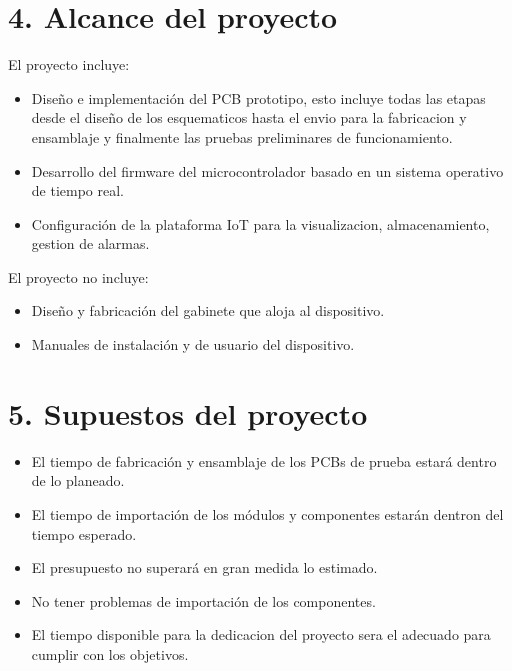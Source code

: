 \documentclass[
11pt, %
codirector, %
]{charter}
\begin{document}
\section{4. Alcance del proyecto}
\label{sec:alcance}
El proyecto incluye:
\begin{itemize}
	\item Diseño e implementación del PCB prototipo, esto incluye todas las etapas desde el diseño de los esquematicos hasta el envio para la fabricacion y ensamblaje y finalmente las pruebas preliminares de funcionamiento.
	\item Desarrollo del firmware del microcontrolador basado en un sistema operativo de tiempo real.
	\item Configuración de la plataforma IoT para la visualizacion, almacenamiento, gestion de alarmas.
\end{itemize}
El proyecto no incluye:
\begin{itemize}
	\item Diseño y fabricación del gabinete que aloja al dispositivo.
	\item Manuales de instalación y de usuario del dispositivo.
\end{itemize}

\section{5. Supuestos del proyecto}
\label{sec:supuestos}

\begin{itemize}
	\item El tiempo de fabricación y ensamblaje de los PCBs de prueba estará dentro de lo planeado.
	\item El tiempo de importación de los módulos y componentes estarán dentron del tiempo esperado.
	\item El presupuesto no superará en gran medida lo estimado.
	\item No tener problemas de importación de los componentes.
	\item El tiempo disponible para la dedicacion del proyecto sera el adecuado para cumplir con
	los objetivos. 
\end{itemize}
\end{document}
